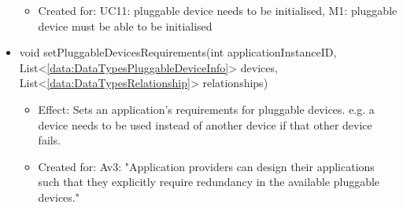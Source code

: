 \begin{description}
\begin{itemize}[noitemsep,nolistsep,leftmargin=-.25cm]
\begin{itemize}[noitemsep,nolistsep]
\item Created for: UC11: pluggable device needs to be initialised, M1: pluggable device must be able to be initialised
        \end{itemize}
      \item \textsf{void setPluggableDevicesRequirements(int applicationInstanceID, List\textless{}\ref{data:DataTypesPluggableDeviceInfo}\textgreater{} devices, List\textless{}\ref{data:DataTypesRelationship}\textgreater{} relationships)}
        \begin{itemize}[noitemsep,nolistsep]
           \item Effect: Sets an application's requirements for pluggable devices. e.g. a device needs to be used instead of another device if that other device fails.
\item Created for: Av3: "Application providers can design their applications such that they explicitly require redundancy in the available pluggable devices."
        \end{itemize}
    \end{itemize}
    \end{description}

